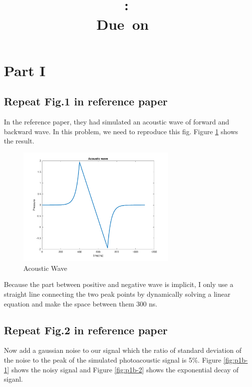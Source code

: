 \documentclass{article}
\title{
    \vspace{2in}
    \textmd{\textbf{\hmwkClass}}\\
    \textmd{\textbf{\hmwkID: \hmwkTitle}} \\
    \normalsize\vspace{0.1in}\small{Due\ on\ \hmwkDueDate}\\
    \vspace{3in}
}
\author{\textbf{\hmwkAuthorName}}
\date{} %
\begin{document}
\maketitle
\newpage


\section{Part \RN{1}}
\subsection{Repeat Fig.1 in reference paper}
In the reference paper, they had simulated an acoustic wave of forward and backward wave. In this problem, we need to reproduce this
fig. Figure \ref{fig:p1a} shows the result.
\begin{figure}[H]
    \centering
    \includegraphics[width=0.7\textwidth]{src/p1a.pdf}
    \caption{Acoustic Wave}
    \label{fig:p1a}
\end{figure}
Because the part between positive and negative wave is implicit, I only use a straight line connecting the two peak points by 
dynamically solving a linear equation and make the space between them 300 ns.

\subsection{Repeat Fig.2 in reference paper}
Now add a gaussian noise to our signal which the ratio of standard deviation of the noise to the peak of the simulated 
photoacoustic signal is 5\%. Figure \ref{fig:p1b-1} shows the noisy signal and Figure \ref{fig:p1b-2} shows the exponential decay
of siganl.
\end{document}
